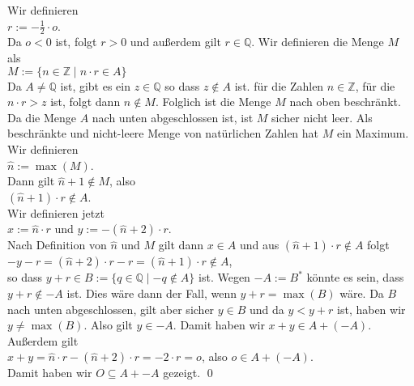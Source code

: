 \begin{enumerate}
      Wir definieren 
      \\[0.2cm]
      \hspace*{1.3cm}
      $r := -\frac{1}{2} \cdot o$.
      \\[0.2cm]
      Da $o < 0$ ist, folgt $r > 0$ und au\ss{}erdem gilt $r \in \mathbb{Q}$.  Wir definieren die Menge
      $M$ als
      \\[0.2cm]
      \hspace*{1.3cm}
      $M := \{ n \in \mathbb{Z} \mid n \cdot r \in  A \}$
      \\[0.2cm]
      Da $A \not= \mathbb{Q}$ ist, gibt es ein $z \in \mathbb{Q}$ so dass $z \not\in A$ ist.
      f\"ur die Zahlen $n \in \mathbb{Z}$, f\"ur die $n \cdot r > z$ ist, folgt dann $n \not\in M$.
      Folglich ist die Menge $M$ nach oben beschr\"ankt.
      Da die Menge $A$ nach unten abgeschlossen ist, ist $M$ sicher nicht leer.
      Als beschr\"ankte und nicht-leere Menge von nat\"urlichen Zahlen hat $M$ ein Maximum.  Wir definieren 
      \\[0.2cm]
      \hspace*{1.3cm}
      $\widehat{n} := \max(M)$.
      \\[0.2cm]
      Dann gilt $\widehat{n} + 1 \not\in M$, also 
      \\[0.2cm]
      \hspace*{1.3cm}
      $(\widehat{n} + 1) \cdot r \not\in A$.  
      \\[0.2cm]
      Wir  definieren  jetzt
      \\[0.2cm]
      \hspace*{1.3cm}
      $x := \widehat{n} \cdot r$ \quad und \quad $y := -(\widehat{n} + 2) \cdot r$.  
      \\[0.2cm]
      Nach  Definition von $\widehat{n}$ und $M$ gilt dann $x \in A$ und aus 
      $(\widehat{n} + 1) \cdot r \not\in A$ folgt
      \\[0.2cm]
      \hspace*{1.3cm}
      $-y - r = (\widehat{n} + 2) \cdot r - r = (\widehat{n} + 1) \cdot r \not\in A$,
      \\[0.2cm]
      so dass $y + r\in B := \{ q \in \mathbb{Q} \mid -q \not\in A \}$ ist.  
      Wegen $-A := B^*$ k\"onnte es sein, dass $y+r \not\in -A$ ist.  Dies w\"are dann der Fall,
      wenn $y+r = \max(B)$ w\"are.  Da $B$ nach unten abgeschlossen, gilt aber sicher $y \in B$
      und da $y < y + r$ ist, haben wir $y \not= \max(B)$.  Also gilt  $y \in -A$.  Damit haben wir $x + y \in A + (-A)$.
      Au\ss{}erdem gilt
      \\[0.2cm]
      \hspace*{1.3cm}
      $x + y = \widehat{n} \cdot r - (\widehat{n} + 2) \cdot r = - 2 \cdot r = o$, \quad also \quad $o \in A + (-A)$.
      \\[0.2cm]
      Damit haben wir $O \subseteq A + -\!A$ gezeigt. 
      \qed
\end{enumerate}

